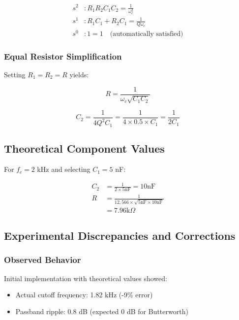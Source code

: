 \documentclass[conference]{IEEEtran}
\begin{document}
\begin{align}
s^2 &: R_1R_2C_1C_2 = \frac{1}{\omega_c^2} \label{eq:coeff1} \\
s^1 &: R_1C_1 + R_2C_1 = \frac{1}{Q\omega_c} \label{eq:coeff2} \\
s^0 &: 1 = 1 \quad \text{(automatically satisfied)}
\end{align}

\subsubsection{Equal Resistor Simplification}
Setting $R_1 = R_2 = R$ yields:

\begin{equation}
R = \frac{1}{\omega_c\sqrt{C_1C_2}}
\label{eq:Rcalc}
\end{equation}

\begin{equation}
C_2 = \frac{1}{4Q^2C_1} = \frac{1}{4 \times 0.5 \times C_1} = \frac{1}{2C_1}
\label{eq:Cratio}
\end{equation}

\subsection{Theoretical Component Values}

For $f_c = 2$ kHz and selecting $C_1 = 5$ nF:

\begin{align*}
C_2 &= \frac{1}{2 \times 5\text{nF}} = 10\text{nF} \\
R &= \frac{1}{12,566 \times \sqrt{5\text{nF} \times 10\text{nF}}} \\
&= 7.96\text{k}\Omega
\end{align*}

\subsection{Experimental Discrepancies and Corrections}

\subsubsection{Observed Behavior}
Initial implementation with theoretical values showed:
\begin{itemize}[leftmargin=*]
\item Actual cutoff frequency: 1.82 kHz (-9\% error)
\item Passband ripple: 0.8 dB (expected 0 dB for Butterworth)
\end{itemize}
\end{document}
